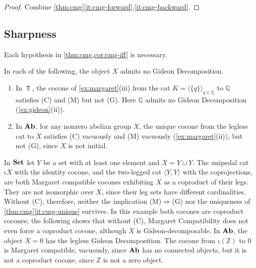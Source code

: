 \begin{proof}
Combine \cref{thm:cmg}\ref{it:cmg-forward},\ref{it:cmg-backward}.
\end{proof}

\subsection*{Sharpness}

Each hypothesis in \cref{thm:cmg,cor:cmg-iff} is necessary.

\begin{counterexample}\label{cex:cmg-existence}
In each of the following, the object $X$ admits no Gideon Decomposition.
\begin{enumerate}
\item In $\Top$, the cocone of \cref{ex:margaret}(iii) from the cat
  $K=\langle\{q\}\rangle_{q\in\mathbb Q}$ to $\mathbb Q$ satisfies (C) and (M) but
  not (G). Here $\mathbb Q$ admits no Gideon Decomposition (\cref{ex:gideon}(ii)).
\item In $\mathbf{Ab}$, for any nonzero abelian group $X$, the unique cocone from the
  legless cat to $X$ satisfies (C) vacuously and (M) vacuously
  (\cref{ex:margaret}(ii)), but not (G), since $X$ is not initial.
\end{enumerate}
\end{counterexample}

\begin{counterexample}\label{cex:cmg-chloe}
In $\mathbf{Set}$ let $Y$ be a set with at least one element and $X=Y\sqcup Y$. The
unipedal cat $\iota X$ with the identity cocone, and the two-legged cat
$\langle Y,Y\rangle$ with the coprojections, are both Margaret compatible cocones
exhibiting $X$ as a coproduct of their legs. They are not isomorphic over $X$,
since their leg sets have different cardinalities. Without (C), therefore,
neither the implication \textup{(M)}$\Rightarrow$\textup{(G)} nor the uniqueness
of \cref{thm:cmg}\ref{it:cmg-unique} survives. In this example both cocones
are coproduct cocones; the following shows that without (C), Margaret
Compatibility does not even force a coproduct cocone, although $X$ is
Gideon-decomposable. In $\mathbf{Ab}$, the object $X=0$ has the legless Gideon
Decomposition. The cocone from $\iota(\mathbb Z)$ to $0$ is Margaret compatible,
vacuously, since $\mathbf{Ab}$ has no connected objects, but it is not a coproduct
cocone, since $\mathbb Z$ is not a zero object.
\end{counterexample}


